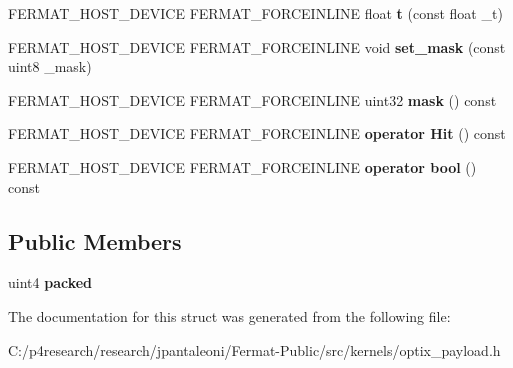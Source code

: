\begin{DoxyCompactItemize}
F\+E\+R\+M\+A\+T\+\_\+\+H\+O\+S\+T\+\_\+\+D\+E\+V\+I\+CE F\+E\+R\+M\+A\+T\+\_\+\+F\+O\+R\+C\+E\+I\+N\+L\+I\+NE float {\bfseries t} (const float \+\_\+t)
\item 
\mbox{\label{struct_payload_a2901b62fdc76244aa8a2523aa69dff73}} 
F\+E\+R\+M\+A\+T\+\_\+\+H\+O\+S\+T\+\_\+\+D\+E\+V\+I\+CE F\+E\+R\+M\+A\+T\+\_\+\+F\+O\+R\+C\+E\+I\+N\+L\+I\+NE void {\bfseries set\+\_\+mask} (const uint8 \+\_\+mask)
\item 
\mbox{\label{struct_payload_acecf9d56226fb3c2ba5bb1ec6316cf97}} 
F\+E\+R\+M\+A\+T\+\_\+\+H\+O\+S\+T\+\_\+\+D\+E\+V\+I\+CE F\+E\+R\+M\+A\+T\+\_\+\+F\+O\+R\+C\+E\+I\+N\+L\+I\+NE uint32 {\bfseries mask} () const
\item 
\mbox{\label{struct_payload_ad4e86f94de366f13c081c3fef9ebb4ff}} 
F\+E\+R\+M\+A\+T\+\_\+\+H\+O\+S\+T\+\_\+\+D\+E\+V\+I\+CE F\+E\+R\+M\+A\+T\+\_\+\+F\+O\+R\+C\+E\+I\+N\+L\+I\+NE {\bfseries operator Hit} () const
\item 
\mbox{\label{struct_payload_a6395d33afc2a2085a95e7f5a32da3555}} 
F\+E\+R\+M\+A\+T\+\_\+\+H\+O\+S\+T\+\_\+\+D\+E\+V\+I\+CE F\+E\+R\+M\+A\+T\+\_\+\+F\+O\+R\+C\+E\+I\+N\+L\+I\+NE {\bfseries operator bool} () const
\end{DoxyCompactItemize}
\subsection*{Public Members}
\begin{DoxyCompactItemize}
\item 
\mbox{\label{struct_payload_aab039ea7845dabfa53185e5258568962}} 
uint4 {\bfseries packed}
\end{DoxyCompactItemize}


The documentation for this struct was generated from the following file\+:\begin{DoxyCompactItemize}
\item 
C\+:/p4research/research/jpantaleoni/\+Fermat-\/\+Public/src/kernels/optix\+\_\+payload.\+h\end{DoxyCompactItemize}
